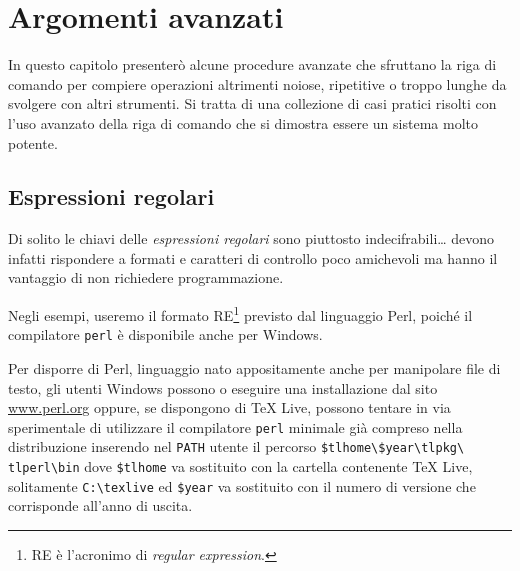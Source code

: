 
\chapter{Argomenti avanzati}
\label{chapAvanz}

In questo capitolo presenterò alcune procedure avanzate che sfruttano la riga di
comando per compiere operazioni altrimenti noiose, ripetitive o troppo lunghe da
svolgere con altri strumenti. Si tratta di una collezione di casi pratici
risolti con l'uso avanzato della riga di comando che si dimostra essere un
sistema molto potente.


\section{Espressioni regolari}

Di solito le chiavi delle \emph{espressioni regolari} sono piuttosto
indecifrabili\dots{} devono infatti rispondere a formati e caratteri di
controllo poco amichevoli ma hanno il vantaggio di non richiedere
programmazione.

Negli esempi, useremo il formato RE\footnote{RE è l'acronimo di \emph{regular
expression}.} previsto dal linguaggio Perl, poiché il compilatore \texttt{perl}
è disponibile anche per Windows.

Per disporre di Perl, linguaggio nato appositamente anche per manipolare file di
testo, gli utenti Windows possono o eseguire una installazione dal sito
\url{www.perl.org} oppure, se dispongono di \TeX{} Live, possono tentare in via
sperimentale di utilizzare il compilatore \texttt{perl} minimale già compreso
nella distribuzione inserendo nel \texttt{PATH} utente il percorso
\texttt{\$tlhome\textbackslash\$year\textbackslash tlpkg\textbackslash
tlperl\textbackslash bin} dove \texttt{\$tlhome} va sostituito con la cartella
contenente \TeX{} Live, solitamente \texttt{C:\textbackslash texlive} ed
\texttt{\$year} va sostituito con il numero di versione che corrisponde all'anno
di uscita.

